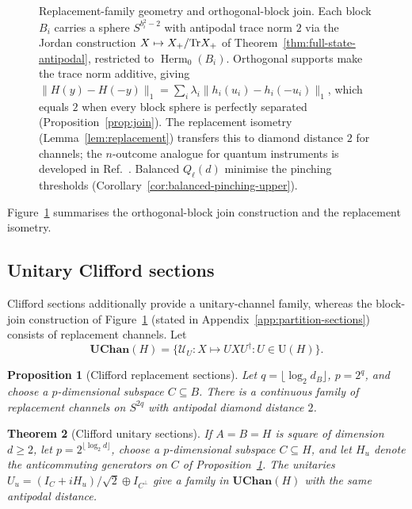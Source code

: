 \documentclass[11pt,a4paper]{article}
\theoremstyle{definition}
\theoremstyle{plain}
\newtheorem{theorem}{Theorem}[section]
\newtheorem{proposition}[theorem]{Proposition}
\theoremstyle{remark}
\DeclareMathOperator{\Herm}{Herm}
\newcommand{\UChan}{\mathbf{UChan}}
\begin{document}
\begin{figure}[t]
\caption{Replacement-family geometry and orthogonal-block join. Each block $B_i$ carries a sphere $S^{b_i^2-2}$ with antipodal trace norm $2$ via the Jordan construction $X\mapsto X_+/{\rm Tr}X_+$ of Theorem~\ref{thm:full-state-antipodal}, restricted to $\Herm_0(B_i)$. Orthogonal supports make the trace norm additive, giving $\|H(y)-H(-y)\|_1=\sum_i\lambda_i\|h_i(u_i)-h_i(-u_i)\|_1$, which equals $2$ when every block sphere is perfectly separated (Proposition~\ref{prop:join}). The replacement isometry (Lemma~\ref{lem:replacement}) transfers this to diamond distance $2$ for channels; the $n$-outcome analogue for quantum instruments is developed in Ref.~\cite{CompanionInstruments}. Balanced $Q_\ell(d)$ minimise the pinching thresholds (Corollary~\ref{cor:balanced-pinching-upper}).}
\label{fig:replacement-join}
\end{figure}

Figure~\ref{fig:replacement-join} summarises the orthogonal-block join construction and the replacement isometry.

\subsection{Unitary Clifford sections}

Clifford sections additionally provide a unitary-channel family, whereas the
block-join construction of Figure~\ref{fig:replacement-join} (stated in
Appendix~\ref{app:partition-sections}) consists of replacement channels. Let
\[
\UChan(H)=\{\mathcal U_U:X\mapsto UXU^\dagger:U\in\mathrm U(H)\}.
\]

\begin{proposition}[Clifford replacement sections]
\label{prop:clifford-replacement}
Let $q=\lfloor\log_2d_B\rfloor$, $p=2^q$, and choose a
$p$-dimensional subspace $C\subseteq B$. There is a continuous family of
replacement channels on $S^{2q}$ with antipodal diamond distance $2$.
\end{proposition}

\begin{theorem}[Clifford unitary sections]
\label{thm:clifford-unitary}
If $A=B=H$ is square of dimension $d\geq2$, let $p=2^{\lfloor\log_2d\rfloor}$,
choose a $p$-dimensional subspace $C\subseteq H$, and let $H_u$ denote the
anticommuting generators on $C$ of Proposition~\ref{prop:clifford-replacement}.
The unitaries $U_u=(I_C+iH_u)/\sqrt2\oplus I_{C^\perp}$ give a family in
$\UChan(H)$ with the same antipodal distance.
\end{theorem}
\end{document}
